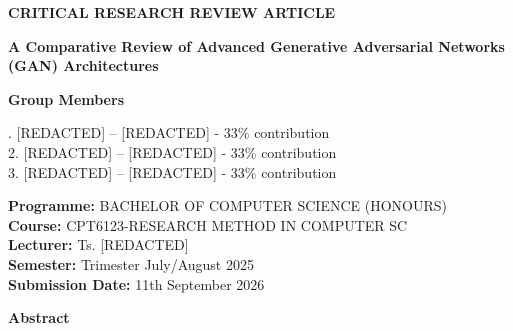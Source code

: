 \documentclass[12pt,a4paper]{article}
\begin{document}
\begin{center}

{\fontsize{18}{22}\selectfont\textbf{CRITICAL RESEARCH REVIEW ARTICLE}}

\vspace{0.5cm}

{\fontsize{18}{22}\selectfont\textbf{A Comparative Review of Advanced Generative Adversarial Networks (GAN) Architectures}}

\vspace{1cm}

{\fontsize{12}{14}\selectfont\textbf{Group Members}}

\vspace{0.3cm}

{\fontsize{12}{14}. [REDACTED] -- [REDACTED] - 33\% contribution \\
2. [REDACTED] -- [REDACTED] - 33\% contribution\\
3. [REDACTED] -- [REDACTED] - 33\% contribution\\

}

\vspace{0.8cm}

{\fontsize{12}{14}\selectfont
\textbf{Programme:} BACHELOR OF COMPUTER SCIENCE (HONOURS) \\
\textbf{Course:} CPT6123-RESEARCH METHOD IN COMPUTER SC\\
\textbf{Lecturer:} Ts. [REDACTED]\\
\textbf{Semester:} Trimester July/August 2025\\
\textbf{Submission Date:} 11th September 2026
}

\end{center}



\vspace{0.5cm}

\noindent
\textbf{Abstract}

\vspace{0.2cm}
\end{document}
